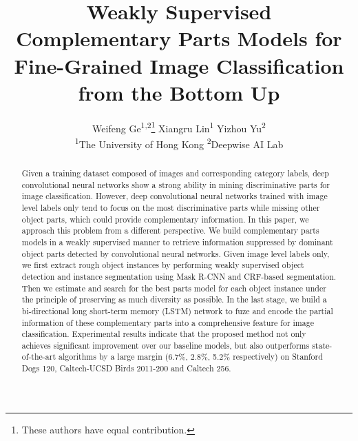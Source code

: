 \documentclass[10pt,twocolumn,letterpaper]{article}
\newcommand*{\affmark}[1][*]{\textsuperscript{#1}}
\newcommand*{\affaddr}[1]{#1}
\begin{document}
\title{Weakly Supervised Complementary Parts Models for Fine-Grained Image Classification from the Bottom Up}





\author{
Weifeng Ge\affmark[1,2]\thanks{These authors have equal contribution.} \hspace{0.6in} Xiangru Lin\affmark[1]\footnotemark[1] \hspace{0.6in} Yizhou Yu\affmark[2] \\
\affaddr{\affmark[1]The University of Hong Kong}
\hspace{0.6in}
\affaddr{\affmark[2]Deepwise AI Lab}\\
}

\maketitle


\begin{abstract}
Given a training dataset composed of images and corresponding category labels, deep convolutional neural networks show a strong ability in mining discriminative parts for image classification. However, deep convolutional neural networks trained with image level labels only tend to focus on the most discriminative parts while missing other object parts, which could provide complementary information. In this paper, we approach this problem from a different perspective. We build complementary parts models in a weakly supervised manner to retrieve information suppressed by dominant object parts detected by convolutional neural networks. Given image level labels only, we first extract rough object instances by performing weakly supervised object detection and instance segmentation using Mask R-CNN and CRF-based segmentation. Then we estimate and search for the best parts model for each object instance under the principle of preserving as much diversity as possible. In the last stage, we build a bi-directional long short-term memory (LSTM) network to fuze and encode the partial information of these complementary parts into a comprehensive feature for image classification.
Experimental results indicate that the proposed method not only achieves significant improvement over our baseline models, but also outperforms state-of-the-art algorithms by a large margin (6.7\%, 2.8\%, 5.2\% respectively) on Stanford Dogs 120, Caltech-UCSD Birds 2011-200 and Caltech 256.
\end{abstract}
\end{document}
